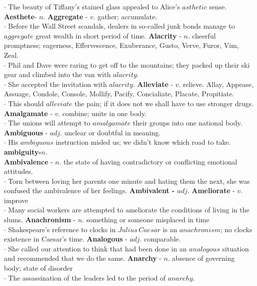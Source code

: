 \documentclass{exam}
\begin{document}
\begin{questions}
$\cdot$ The beauty of Tiffany's stained glass appealed to Alice's $asthetic$ sense. \textbf{Aesthete}- $n.$
\question \textbf{Aggregate} - $v.$ gather; accumulate.\\
$\cdot$ Before the Wall Street scandals, dealers in so-called junk bonds manage to $aggregate$ great wealth in short period of time.
\question \textbf{ Alacrity} - $n.$ cheerful promptness; eagerness, Effervescence, Exuberance, Gusto, Verve, Furor, Vim, Zeal.\\
$\cdot$ Phil and Dave were raring to get off to the mountains; they packed up their ski gear and climbed into the van with $alacrity.$\\
$\cdot$ She accepted the invitation with $alacrity.$
\question \textbf{Alleviate} - $v.$ relieve. Allay, Appease, Assuage, Condole, Console, Mollify, Pacify, Concialiate, Placate, Propitiate.\\
$\cdot$ This should $alleviate$ the pain; if it does not we shall have to use stronger drugs.
\question \textbf{Amalgamate} - $v.$ combine; unite in one body.\\
 $\cdot$ The unions will attempt to $amalgamate$ their groups into one national body.
 \question \textbf{Ambiguous} - $adj.$ unclear or doubtful in meaning.\\
 $\cdot$ His $ambiguous$ instruction misled us; we didn't know which road to take. \textbf{ambiguity-$n.$}\\
 \question \textbf{Ambivalence} - $n.$ the state of having contradictory or conflicting emotional attitudes.\\
 $\cdot$ Torn between loving her parents one minute and hating them the next, she was confused the ambivalence of her feelings. \textbf{Ambivalent - $adj.$}
\question \textbf{Ameliorate} - $v.$ improve\\
 $\cdot$ Many social workers are attempted to ameliorate the conditions of living in the slums.
\question \textbf{Anachronism} - $n.$ something or someone misplaced in time\\
 $\cdot$ Shakespeare's reference to clocks in $Julius\, Caesar$ is an $anachronism$; no clocks existence in Caesar's time.
 \question \textbf{Analogous} - $adj.$  comparable.\\
$\cdot$ She called our attention to think that had been done in an $analogous$ situation and recommended that we do the same. 
 \question \textbf{Anarchy} - $n.$ absence of governing body; state of disorder\\
$\cdot$ The assassination of the leaders led to the period of $anarchy$.

\end{questions}
\end{document}
